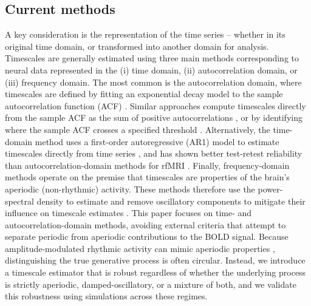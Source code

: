 \documentclass[docs/main.tex]{subfiles}
\begin{document}
\subsection{Current methods}
A key consideration is the representation of the time series -- whether in its original time domain, or transformed into another domain for analysis. Timescales are generally estimated using three main methods corresponding to neural data represented in the (i) time domain, (ii) autocorrelation domain, or (iii) frequency domain. The most common is the autocorrelation domain, where timescales are defined by fitting an exponential decay model to the sample autocorrelation function (ACF) \citep{rossi-pool_invariant_2021, cirillo_neural_2018, ito_cortical_2020, runyan_distinct_2017, zeraati_flexible_2022, nougaret_intrinsic_2021, wasmuht_intrinsic_2018, muller_core_2020, maisson_choice-relevant_2021, li_hierarchical_2022, shafiei_topographic_2020}. Similar approaches compute timescales directly from the sample ACF as the sum of positive autocorrelations \citep{wengler_distinct_2020, manea_intrinsic_2022, watanabe_atypical_2019}, or by identifying where the sample ACF crosses a specified threshold \citep{wengler_distinct_2020, zilio_are_2021}. Alternatively, the time-domain method uses a first-order autoregressive (AR1) model to estimate timescales directly from time series \citep{kaneoke_variance_2012, meisel_decline_2017, huang_timescales_2018, lurie_cortical_2024, shinn_functional_2023, shafiei_topographic_2020, spitmaan_multiple_2020, trepka_training-dependent_2024}, and has shown better test-retest reliability than autocorrelation-domain methods for rfMRI \citep{huang_timescales_2018}. Finally, frequency-domain methods operate on the premise that timescales are properties of the brain's aperiodic (non-rhythmic) activity. These methods therefore use the power-spectral density to estimate and remove oscillatory components to mitigate their influence on timescale estimates \citep{donoghue_parameterizing_2020, gao_neuronal_2020, manea_neural_2024, zeraati_flexible_2022, fallon_timescales_2020}. This paper focuses on time- and autocorrelation-domain methods, avoiding external criteria that attempt to separate periodic from aperiodic contributions to the BOLD signal. Because amplitude-modulated rhythmic activity can mimic aperiodic properties \citep{he_temporal_2010, he_scale-free_2011}, distinguishing the true generative process is often circular. Instead, we introduce a timescale estimator that is robust regardless of whether the underlying process is strictly aperiodic, damped-oscillatory, or a mixture of both, and we validate this robustness using simulations across these regimes.
\end{document}
